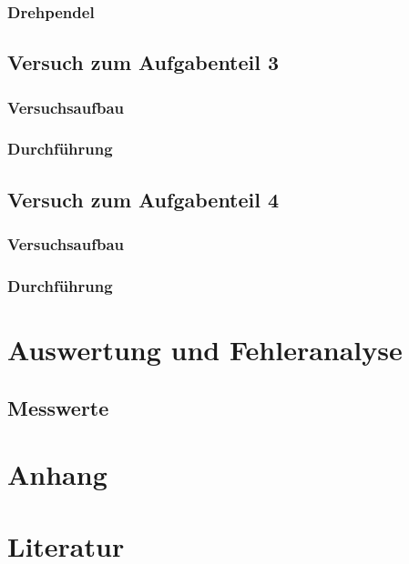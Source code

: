 \documentclass[11pt,a4paper]{article}
\begin{document}
	
       \subsubsection{Drehpendel}

\subsection{Versuch zum Aufgabenteil 3}
      \subsubsection{Versuchsaufbau}
      \subsubsection{Durchführung}

\subsection{Versuch zum Aufgabenteil 4}
     \subsubsection{Versuchsaufbau}
     \subsubsection{Durchführung}
\section{Auswertung und Fehleranalyse}
\subsection{Messwerte}



\newpage
\section{Anhang}
%

\nocite{*}
\newpage
\section{Literatur}
\newpage
%
\end{document}
